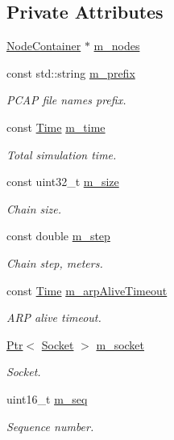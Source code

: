 \subsection*{Private Attributes}
\begin{DoxyCompactItemize}
\item 
\hyperlink{classns3_1_1NodeContainer}{Node\+Container} $\ast$ \hyperlink{classChainRegressionTest_a9df3157b70f521bddeb6184f0e7c48a3}{m\+\_\+nodes}
\item 
const std\+::string \hyperlink{classChainRegressionTest_ac11ece02445e290f10eef8c73542b60a}{m\+\_\+prefix}
\begin{DoxyCompactList}\small\item\em P\+C\+AP file names prefix. \end{DoxyCompactList}\item 
const \hyperlink{classns3_1_1Time}{Time} \hyperlink{classChainRegressionTest_aaba809877469a5652b1b62461744e2c7}{m\+\_\+time}
\begin{DoxyCompactList}\small\item\em Total simulation time. \end{DoxyCompactList}\item 
const uint32\+\_\+t \hyperlink{classChainRegressionTest_a0b140f49f0f8bad41cba6bd2c68c11b8}{m\+\_\+size}
\begin{DoxyCompactList}\small\item\em Chain size. \end{DoxyCompactList}\item 
const double \hyperlink{classChainRegressionTest_a9700cff3675b8d166d41e4d479a1c3ac}{m\+\_\+step}
\begin{DoxyCompactList}\small\item\em Chain step, meters. \end{DoxyCompactList}\item 
const \hyperlink{classns3_1_1Time}{Time} \hyperlink{classChainRegressionTest_a7dda0494d54670d515ff7821993710de}{m\+\_\+arp\+Alive\+Timeout}
\begin{DoxyCompactList}\small\item\em A\+RP alive timeout. \end{DoxyCompactList}\item 
\hyperlink{classns3_1_1Ptr}{Ptr}$<$ \hyperlink{classns3_1_1Socket}{Socket} $>$ \hyperlink{classChainRegressionTest_ad5f524009bcd54ac069a4a6b9d58bcd0}{m\+\_\+socket}
\begin{DoxyCompactList}\small\item\em Socket. \end{DoxyCompactList}\item 
uint16\+\_\+t \hyperlink{classChainRegressionTest_a4b038b8f43087a96aaa1b94d6f351733}{m\+\_\+seq}
\begin{DoxyCompactList}\small\item\em Sequence number. \end{DoxyCompactList}\end{DoxyCompactItemize}
